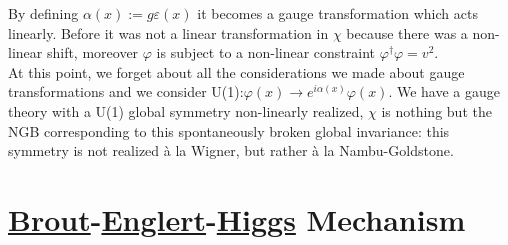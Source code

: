 \documentclass[../main.tex]{subfiles}
\begin{document}
By defining $\alpha(x):=g\varepsilon(x)$ it becomes a gauge transformation which acts linearly. Before it was not a linear transformation in $\chi$ because there was a non-linear shift, moreover $\varphi$ is subject to a non-linear constraint $\varphi^\dagger\varphi=v^2$.\\
At this point, we forget about all the considerations we made about gauge transformations and we consider U(1):$\varphi(x)\to e^{i\alpha(x)}\varphi(x)$. We have a gauge theory with a U(1) global symmetry non-linearly realized, $\chi$ is nothing but the NGB corresponding to this spontaneously broken global invariance: this symmetry is not realized à la Wigner, but rather à la Nambu-Goldstone.

\section{\href{https://en.wikipedia.org/wiki/Robert_Brout}{Brout}-\href{https://en.wikipedia.org/wiki/Francois_Englert}{Englert}-\href{https://en.wikipedia.org/wiki/Peter_Higgs}{Higgs} Mechanism}
\end{document}
